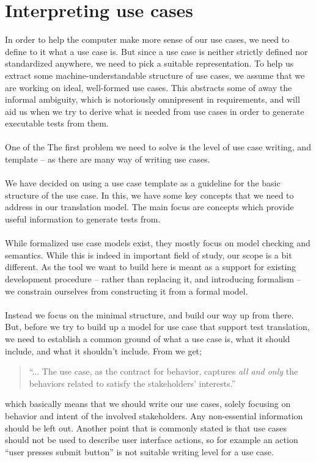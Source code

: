\section{Interpreting use cases}
In order to help the computer make more sense of our use cases, we need to define to it what a use case is. But since a use case is neither strictly defined nor standardized anywhere, we need to pick a suitable representation.
To help us extract some machine-understandable structure of use cases, we assume that we are working on ideal, well-formed use cases. This abstracts some of away the informal ambiguity, which is notoriously omnipresent in requirements, and will aid us when we try to derive what is needed from use cases in order to generate executable tests from them.\\\\
One of the The first problem we need to solve is the level of use case writing, and template -- as there are many way of writing use cases.\\\\
We have decided on using a use case template\cite{larman2005} as a guideline for the basic structure of the use case. In this, we have some key concepts that we need to address in our translation model. The main focus are concepts which provide useful information to generate tests from.\\\\
While formalized use case models exist\cite{klimek2010formal}, they mostly focus on model checking and semantics. While this is indeed in important field of study, our scope is a bit different. As the tool we want to build here is meant as a support for existing development procedure -- rather than replacing it, and introducing formalism -- we constrain ourselves from constructing it from a formal model.\\\\
Instead we focus on the minimal structure, and build our way up from there. But, before we try to build up a model for use case that support test translation, we need to establish a common ground of what a use case is, what it should include, and what it shouldn't include. From \cite{cockburn2000} we get;
\begin{quote}
``... The use case, as the contract for behavior, captures \emph{all and only} the behaviors related to satisfy the stakeholders’ interests.''
\end{quote}which basically means that we should write our use cases, solely focusing on behavior and intent of the involved stakeholders. Any non-essential information should be left out. Another point that is commonly stated is that use cases should not be used to describe user interface actions, so for example an action ``user presses submit button'' is not suitable writing level for a use case.\\\\
